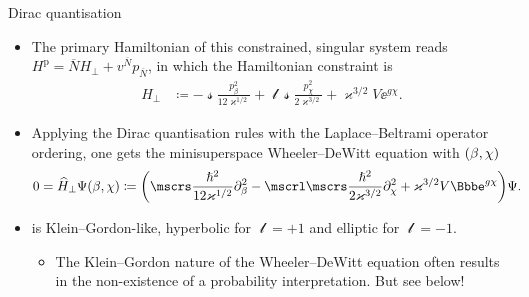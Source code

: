 \documentclass[8pt]{beamer}
\begin{document}
\begin{frame}%
{Dirac quantisation}%
\begin{itemize}
\item
The primary Hamiltonian of this constrained, singular
system reads
$H^\text{p} = \overline{N}H_\perp + v^{\overline{N}} p_{\overline{N}}$,
in which the Hamiltonian constraint is
\begin{align}
H_\perp &\coloneqq -\mscrs\frac{p_\beta^2}{12\varkappa^{1/2}}
+\mscrl\mscrs\frac{p_\chi^2}{2\varkappa^{3/2}}
+\varkappa^{3/2}V\ee^{g\chi}.
\end{align}
\item
Applying the Dirac quantisation rules with the Laplace--Beltrami
operator ordering, one 
gets the minisuperspace Wheeler--DeWitt equation with ${\left(\beta,\chi\right)}$
\begin{align}
0 &= \widehat{H}_\perp \rfun{\Psi}{\beta,\chi} \coloneqq
\rbr{\mscrs\frac{\hslash^2}{12\varkappa^{1/2}}\partial_{\beta}^2
-\mscrl\mscrs\frac{\hslash^2}{2\varkappa^{3/2}}\partial_{\chi}^2
+\varkappa^{3/2}V\ee^{g \chi}}\Psi.
\label{eq:WDW-10}
\end{align}
\item
{} is Klein--Gordon-like, hyperbolic for $\mscrl = +1$ and 
\alert{elliptic} for $\mscrl = -1$.
\begin{itemize}
\item The Klein--Gordon nature of the Wheeler--DeWitt equation
often results in the non-existence of a probability interpretation. But see
below!
\end{itemize}
\end{itemize}
\end{frame}
\end{document}
